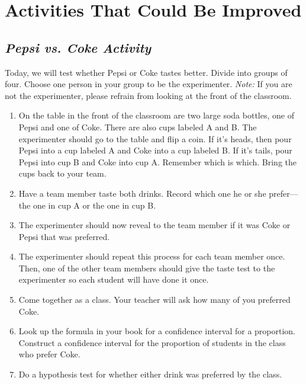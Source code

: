 \section{\textbf{Activities That Could Be Improved}}

\subsection{\textbf{\textit{Pepsi vs. Coke Activity}}}
Today, we will test whether Pepsi or Coke tastes better.  Divide into groups of four. Choose one person in your group to be the experimenter. \textit{Note:} If you are not the experimenter, please refrain from looking at the front of the classroom.
 
 \renewcommand{\labelenumi}{\arabic{enumi}.}
  
\begin{enumerate}[leftmargin=1cm, itemsep=.2em]
\item On the table in the front of the classroom are two large soda bottles, one of Pepsi and one of Coke. There are also cups labeled A and B. The experimenter should go to the table and flip a coin. If it's heads, then pour Pepsi into a cup labeled A and Coke into a cup labeled B. If it's tails, pour Pepsi into cup B and Coke into cup A. Remember which is which. Bring the cups back to your team.
\item Have a team member taste both drinks. Record which one he or she prefer---the one in cup A or the one in cup B.
\item The experimenter should now reveal to the team member if it was Coke or Pepsi that was preferred.
\item The experimenter should repeat this process for each team member once. Then, one of the other team members should give the taste test to the experimenter so each student will have done it once.
\item Come together as a class. Your teacher will ask how many of you preferred Coke. 
\item Look up the formula in your book for a confidence interval for a proportion. Construct a confidence interval for the proportion of students in the class who prefer Coke.
\item Do a hypothesis test for whether either drink was preferred by the class. 
\end{enumerate}




